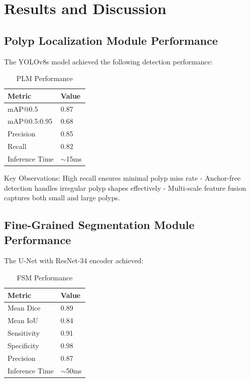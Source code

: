 \documentclass[runningheads]{llncs}
\begin{document}
\section{Results and Discussion}

\subsection{Polyp Localization Module Performance}
The YOLOv8s model achieved the following detection performance:

\begin{table}[H]
\caption{PLM Performance}
\label{tab:plm_results}
\centering
\begin{tabular}{ll}
\toprule
\textbf{Metric} & \textbf{Value} \\
\midrule
mAP@0.5 & 0.87 \\
mAP@0.5:0.95 & 0.68 \\
Precision & 0.85 \\
Recall & 0.82 \\
Inference Time & $\sim$15ms \\
\bottomrule
\end{tabular}
\end{table}

Key Observations: High recall ensures minimal polyp miss rate - Anchor-free detection handles irregular polyp shapes effectively - Multi-scale feature fusion captures both small and large polyps.

\subsection{Fine-Grained Segmentation Module Performance}
The U-Net with ResNet-34 encoder achieved:

\begin{table}[H]
\caption{FSM Performance}
\label{tab:fsm_results}
\centering
\begin{tabular}{ll}
\toprule
\textbf{Metric} & \textbf{Value} \\
\midrule
Mean Dice & 0.89 \\
Mean IoU & 0.84 \\
Sensitivity & 0.91 \\
Specificity & 0.98 \\
Precision & 0.87 \\
Inference Time & $\sim$50ms \\
\bottomrule
\end{tabular}
\end{table}
\end{document}
